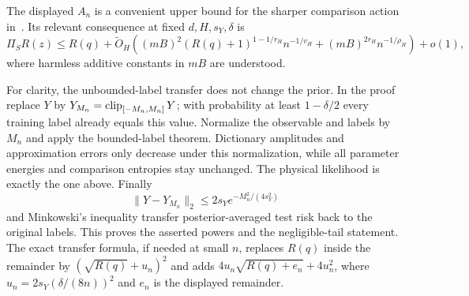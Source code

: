 The displayed $A_n$ is a convenient upper bound for the sharper
comparison action in~\cite{gaussian}. Its relevant consequence at
fixed $d,H,s_Y,\delta$ is
\begin{equation}
 \Pi_SR(z)\le R(q)+
 \widetilde O_H\left((mB)^2(R(q)+1)^{1-1/r_H}n^{-1/v_H}
              +(mB)^{2r_H}n^{-1/\rho_H}
\right)+o(1),
 \label{eq:gaussian-interface-coarse}
\end{equation}
where harmless additive constants in $mB$ are understood.

For clarity, the unbounded-label transfer does not change the prior.
In the proof replace $Y$ by $Y_{M_n}=\operatorname{clip}_{[-M_n,M_n]}Y$; with
probability at least $1-\delta/2$ every training label already equals
this value. Normalize the observable and labels by $M_n$ and apply
the bounded-label theorem. Dictionary amplitudes and approximation
errors only decrease under this normalization, while all parameter
energies and comparison entropies stay unchanged. The physical
likelihood is exactly the one above. Finally
\[
 \|Y-Y_{M_n}\|_2\le
 2s_Ye^{-M_n^2/(4s_Y^2)}
\]
and Minkowski's inequality transfer posterior-averaged test risk back
to the original labels. This proves the asserted powers and the
negligible-tail statement. The exact transfer formula, if needed at
small $n$, replaces $R(q)$ inside the remainder by
$(\sqrt{R(q)}+u_n)^2$ and adds
$4u_n\sqrt{R(q)+e_n}+4u_n^2$, where
$u_n=2s_Y(\delta/(8n))^2$ and $e_n$ is the displayed remainder.
